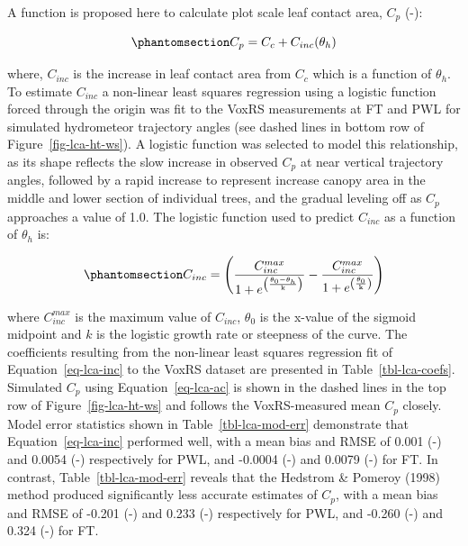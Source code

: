 \documentclass[
  letterpaper,
  DIV=11,
  numbers=noendperiod]{scrartcl}
\begin{document}
A function is proposed here to calculate plot scale leaf contact area,
\(C_p\) (-):

\begin{equation}\phantomsection\label{eq-lca-ac}{
C_p = C_c + C_{inc}(\theta_h)
}\end{equation}

where, \(C_{inc}\) is the increase in leaf contact area from \(C_c\)
which is a function of \(\theta_h\). To estimate \(C_{inc}\) a
non-linear least squares regression using a logistic function forced
through the origin was fit to the VoxRS measurements at FT and PWL for
simulated hydrometeor trajectory angles (see dashed lines in bottom row
of Figure~\ref{fig-lca-ht-ws}). A logistic function was selected to
model this relationship, as its shape reflects the slow increase in
observed \(C_p\) at near vertical trajectory angles, followed by a rapid
increase to represent increase canopy area in the middle and lower
section of individual trees, and the gradual leveling off as \(C_p\)
approaches a value of 1.0. The logistic function used to predict
\(C_{inc}\) as a function of \(\theta_h\) is:

\begin{equation}\phantomsection\label{eq-lca-inc}{
C_{inc} = \left(
\frac{C^{max}_{inc}}{1 + e ^ {\left(\frac{\theta_0 - \theta_h}{\text{k}}\right)}} - \frac{C^{max}_{inc}}{1 + e ^ {\left(\frac{\theta_0}{\text{k}}\right)}}
\right)
}\end{equation}

where \(C^{max}_{inc}\) is the maximum value of \(C_{inc}\),
\(\theta_0\) is the x-value of the sigmoid midpoint and \(k\) is the
logistic growth rate or steepness of the curve. The coefficients
resulting from the non-linear least squares regression fit of
Equation~\ref{eq-lca-inc} to the VoxRS dataset are presented in
Table~\ref{tbl-lca-coefs}. Simulated \(C_p\) using
Equation~\ref{eq-lca-ac} is shown in the dashed lines in the top row of
Figure~\ref{fig-lca-ht-ws} and follows the VoxRS-measured mean \(C_p\)
closely. Model error statistics shown in Table~\ref{tbl-lca-mod-err}
demonstrate that Equation~\ref{eq-lca-inc} performed well, with a mean
bias and RMSE of 0.001 (-) and 0.0054 (-) respectively for PWL, and
-0.0004 (-) and 0.0079 (-) for FT. In contrast,
Table~\ref{tbl-lca-mod-err} reveals that the Hedstrom \& Pomeroy (1998)
method produced significantly less accurate estimates of \(C_p\), with a
mean bias and RMSE of -0.201 (-) and 0.233 (-) respectively for PWL, and
-0.260 (-) and 0.324 (-) for FT.
\end{document}

